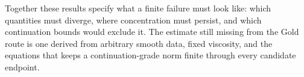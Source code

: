 Together these results specify what a finite failure must look like: which quantities must diverge, where concentration must persist, and which continuation bounds would exclude it.
The estimate still missing from the Gold route is one derived from arbitrary smooth data, fixed viscosity, and the equations that keeps a continuation-grade norm finite through every candidate endpoint.
